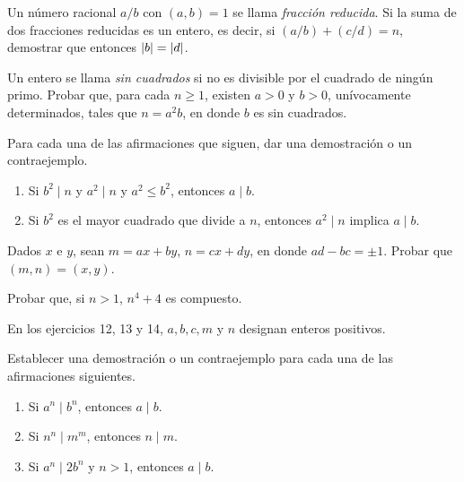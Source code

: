 \documentclass[12pt,a4paper]{book}
\begin{document}
    \begin{ejercicio}
        Un número racional $a/b$ con $(a,b)=1$ se llama \textit{fracción reducida}. Si la
        suma de dos fracciones reducidas es un entero, es decir, si $(a/b)+(c/d)=n$,
        demostrar que entonces $\abs{b}=\abs{d}$.
    \end{ejercicio}

    \begin{ejercicio}
        Un entero se llama \textit{sin cuadrados} si no es divisible por el cuadrado de
        ningún primo. Probar que, para cada $n\geq1$, existen $a>0$ y $b>0$, unívocamente
        determinados, tales que $n=a^2b$, en donde $b$ es sin cuadrados.
    \end{ejercicio}

    \begin{ejercicio}
        Para cada una de las afirmaciones que siguen, dar una demostración o un
        contraejemplo.
        \begin{enumerate}
            \item[(a)] Si $b^2\mid n$ y $a^2\mid n$ y $a^2\leq b^2$, entonces $a\mid b$.
            \item[(b)] Si $b^2$ es el mayor cuadrado que divide a $n$, entonces $a^2\mid n$
            implica $a\mid b$.
        \end{enumerate}
    \end{ejercicio}

    \begin{ejercicio}
        Dados $x$ e $y$, sean $m=ax+by$, $n=cx+dy$, en donde $ad-bc=\pm1$. Probar que
        $(m,n)=(x,y)$.
    \end{ejercicio}

    \begin{ejercicio}
        Probar que, si $n>1$, $n^4+4$ es compuesto.
    \end{ejercicio}

    En los ejercicios 12, 13 y 14, $a,b,c,m$ y $n$ designan enteros positivos.

    \begin{ejercicio}
        Establecer una demostración o un contraejemplo para cada una de las afirmaciones
        siguientes.
        \begin{enumerate}
            \item[(a)] Si $a^n\mid b^n$, entonces $a\mid b$.
            \item[(b)] Si $n^n\mid m^m$, entonces $n\mid m$.
            \item[(c)] Si $a^n\mid 2b^n$ y $n>1$, entonces $a\mid b$.
        \end{enumerate}
    \end{ejercicio}
\end{document}
